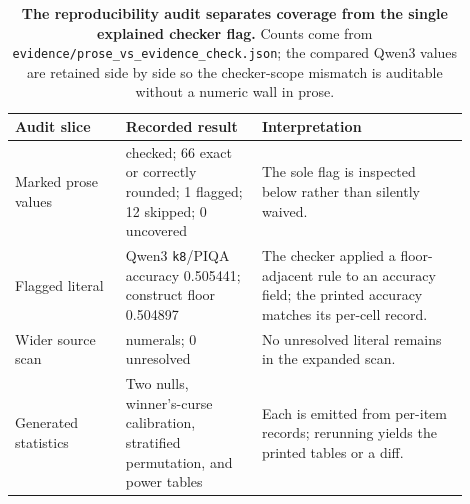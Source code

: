 \begin{table}[H]
\centering
\small
\setlength{\tabcolsep}{4pt}
\begin{tabular}{>{\raggedright\arraybackslash}p{0.22\linewidth} >{\raggedright\arraybackslash}p{0.27\linewidth} >{\raggedright\arraybackslash}p{0.41\linewidth}}
\toprule
Audit slice & Recorded result & Interpretation \\
\midrule
Marked prose values & 67 checked; 66 exact or correctly rounded; 1 flagged; 12 skipped; 0 uncovered & The sole flag is inspected below rather than silently waived. \\
Flagged literal & Qwen3 \texttt{k8}/PIQA accuracy 0.505441; construct floor 0.504897 & The checker applied a floor-adjacent rule to an accuracy field; the printed accuracy matches its per-cell record. \\
Wider source scan & 653 numerals; 0 unresolved & No unresolved literal remains in the expanded scan. \\
Generated statistics & Two nulls, winner's-curse calibration, stratified permutation, and power tables & Each is emitted from per-item records; rerunning yields the printed tables or a diff. \\
\bottomrule
\end{tabular}
\caption{\textbf{The reproducibility audit separates coverage from the single explained checker flag.} Counts come from \texttt{evidence/prose\_vs\_evidence\_check.json}; the compared Qwen3 values are retained side by side so the checker-scope mismatch is auditable without a numeric wall in prose.}
\label{tab:repro-audit}
\end{table}
